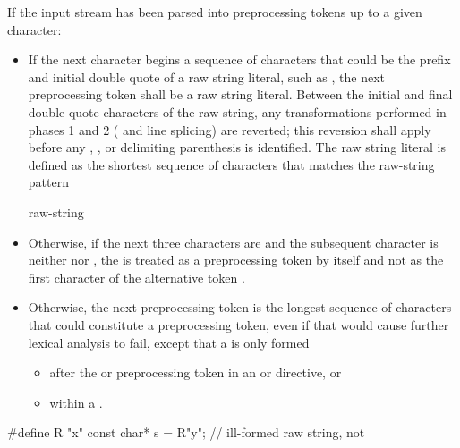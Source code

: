 \pnum
If the input stream has been parsed into preprocessing tokens up to a
given character:
\begin{itemize}
\item
{}%
If the next character begins a sequence of characters that could be the prefix
and initial double quote of a raw string literal, such as , the next preprocessing
token shall be a raw string literal. Between the initial and final
double quote characters of the raw string, any transformations performed in phases
1 and 2 ( and line splicing) are reverted; this reversion
shall apply before any , , or delimiting
parenthesis is identified. The raw string literal is defined as the shortest sequence
of characters that matches the raw-string pattern
\begin{ncbnf}
  raw-string
\end{ncbnf}

\item Otherwise, if the next three characters are \tcode{<::} and the subsequent character
is neither \tcode{:} nor \tcode{>}, the \tcode{<} is treated as a preprocessing token by
itself and not as the first character of the alternative token \tcode{<:}.

\item Otherwise,
the next preprocessing token is the longest sequence of
characters that could constitute a preprocessing token, even if that
would cause further lexical analysis to fail,
except that a  is only formed
\begin{itemize}
\item
after the  or  preprocessing token in an
 or
 directive, or

\item
within a .
\end{itemize}
\end{itemize}

\begin{example}
\begin{codeblock}
#define R "x"
const char* s = R"y";           // ill-formed raw string, not 
\end{codeblock}
\end{example}

